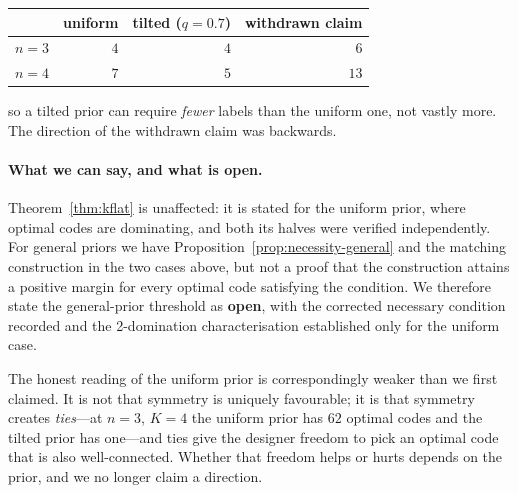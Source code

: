 \begin{center}\small
\begin{tabular}{@{}lrrr@{}}
\toprule
 & uniform & tilted ($q = 0.7$) & withdrawn claim \\
\midrule
$n = 3$ & $4$ & $4$ & $6$ \\
$n = 4$ & $7$ & $5$ & $13$ \\
\bottomrule
\end{tabular}
\end{center}

so a tilted prior can require \emph{fewer} labels than the uniform one, not
vastly more. The direction of the withdrawn claim was backwards.

\paragraph{What we can say, and what is open.}
Theorem~\ref{thm:kflat} is unaffected: it is stated for the uniform prior, where
optimal codes are dominating, and both its halves were verified independently.
For general priors we have Proposition~\ref{prop:necessity-general} and the
matching construction in the two cases above, but not a proof that the
construction attains a positive margin for every optimal code satisfying the
condition. We therefore state the general-prior threshold as \textbf{open}, with
the corrected necessary condition recorded and the 2-domination characterisation
established only for the uniform case.

The honest reading of the uniform prior is correspondingly weaker than we first
claimed. It is not that symmetry is uniquely favourable; it is that symmetry
creates \emph{ties}---at $n=3$, $K=4$ the uniform prior has $62$ optimal codes
and the tilted prior has one---and ties give the designer freedom to pick an
optimal code that is also well-connected. Whether that freedom helps or hurts
depends on the prior, and we no longer claim a direction.
